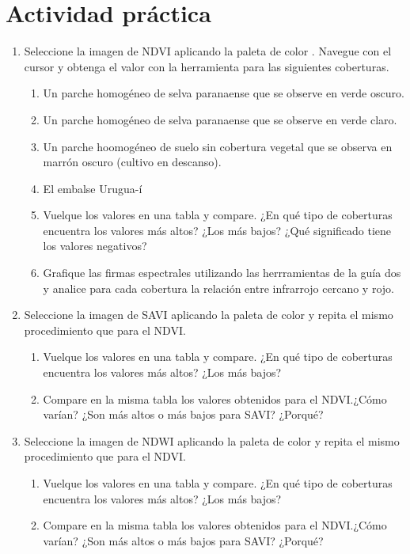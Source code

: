 \section{Actividad práctica}
\begin{enumerate}
  \item Seleccione la imagen de NDVI aplicando la paleta de color . Navegue con el cursor y obtenga el valor con la herramienta  para las siguientes coberturas.
  \begin{enumerate}

    \item Un parche homogéneo de selva paranaense que se observe en verde oscuro.
    \item Un parche homogéneo de selva paranaense que se observe en verde claro.
    \item Un parche hoomogéneo de suelo sin cobertura vegetal que se observa en marrón oscuro (cultivo en descanso).
    \item El embalse Urugua-í
    \item Vuelque los valores en una tabla y compare. ¿En qué tipo de coberturas encuentra los valores más altos? ¿Los más bajos? ¿Qué significado tiene los valores negativos?
    \item Grafique las firmas espectrales utilizando las herrramientas de la guía dos y analice para cada cobertura la relación entre infrarrojo cercano y rojo.
    \end{enumerate}


  \item Seleccione la imagen de SAVI aplicando la paleta de color  y repita el mismo procedimiento que para el NDVI.
  \begin{enumerate}
   \item Vuelque los valores en una tabla y compare. ¿En qué tipo de coberturas encuentra los valores más altos? ¿Los más bajos?
   \item Compare en la misma tabla los valores obtenidos para el NDVI.¿Cómo varían? ¿Son más altos o más bajos para SAVI? ¿Porqué?

\end{enumerate}

\item Seleccione la imagen de NDWI aplicando la paleta de color  y repita el mismo procedimiento que para el NDVI.
  \begin{enumerate}
   \item Vuelque los valores en una tabla y compare. ¿En qué tipo de coberturas encuentra los valores más altos? ¿Los más bajos?
   \item Compare en la misma tabla los valores obtenidos para el NDVI.¿Cómo varían? ¿Son más altos o más bajos para SAVI? ¿Porqué?


\end{enumerate}
\end{enumerate}
